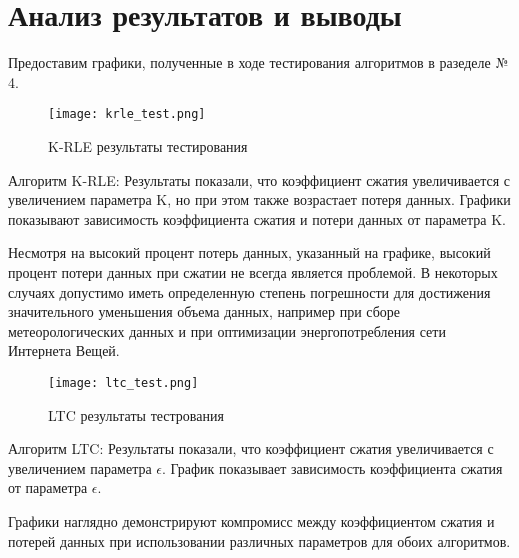 \chapter{Анализ результатов и выводы}

Предоставим графики, полученные в ходе тестирования алгоритмов в разеделе № 4.

\begin{figure}[ht]
    \centering
    \texttt{[image: krle\_test.png]}
    \caption{K-RLE результаты тестирования}
    \label{fig:krle_test}
\end{figure}
Алгоритм K-RLE: Результаты показали, что коэффициент сжатия увеличивается с увеличением параметра K, но при этом также возрастает потеря данных. Графики показывают зависимость коэффициента сжатия и потери данных от параметра K.

Несмотря на высокий процент потерь данных, указанный на графике, высокий процент потери данных при сжатии не всегда является проблемой. В некоторых случаях допустимо иметь определенную степень погрешности для достижения значительного уменьшения объема данных, например при сборе метеорологических данных и при оптимизации энергопотребления сети Интернета Вещей.

\begin{figure}[ht]
    \centering
    \texttt{[image: ltc\_test.png]}
    \caption{LTC результаты тестрования}
    \label{fig:ltc_test}
\end{figure}
Алгоритм LTC: Результаты показали, что коэффициент сжатия увеличивается с увеличением параметра $\epsilon$. График показывает зависимость коэффициента сжатия от параметра $\epsilon$. 

Графики наглядно демонстрируют компромисс между коэффициентом сжатия и потерей данных при использовании различных параметров для обоих алгоритмов.

\endinput